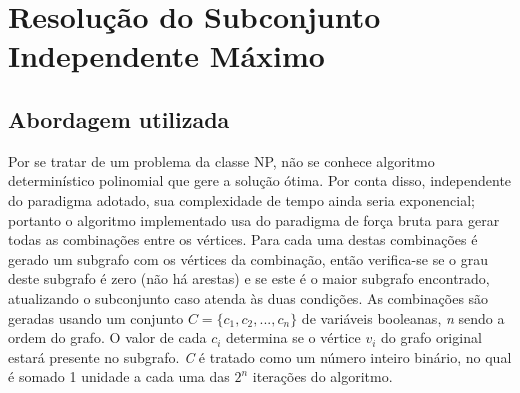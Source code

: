 \documentclass{article}
\begin{document}
\section{Resolução do Subconjunto Independente Máximo}
\subsection{Abordagem utilizada}
Por se tratar de um problema da classe NP, não se conhece algoritmo determinístico polinomial que gere a solução ótima. Por conta disso, independente do paradigma adotado, sua complexidade de tempo ainda seria exponencial; portanto o algoritmo implementado usa do paradigma de força bruta para gerar todas as combinações entre os vértices. Para cada uma destas combinações é gerado um subgrafo com os vértices da combinação, então verifica-se se o grau deste subgrafo é zero (não há arestas) e se este é o maior subgrafo encontrado, atualizando o subconjunto caso atenda às duas condições. As combinações são geradas usando um conjunto $C = \{c_1, c_2, ..., c_n\}$ de variáveis booleanas, \textit{n} sendo a ordem do grafo. O valor de cada $c_i$ determina se o vértice $v_i$ do grafo original estará presente no subgrafo. \textit{C} é tratado como um número inteiro binário, no qual é somado 1 unidade a cada uma das $2^n$ iterações do algoritmo.
\end{document}
